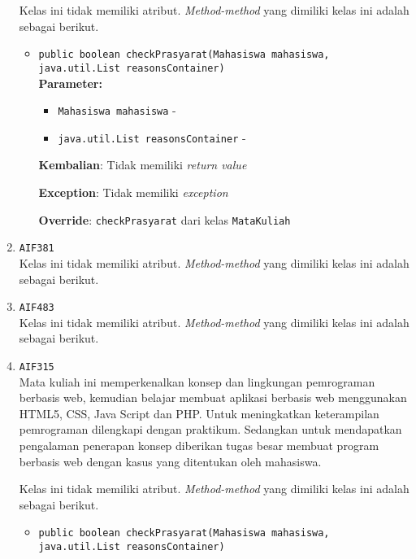 \documentclass{article}
\begin{document}
\begin{enumerate}
Kelas ini tidak memiliki atribut. \textit{Method-method} yang dimiliki kelas ini adalah sebagai berikut.
\begin{itemize}
\item \texttt{public boolean checkPrasyarat(Mahasiswa mahasiswa, java.util.List reasonsContainer)}\\ 


\textbf{Parameter:}\begin{itemize}
\item \texttt{Mahasiswa mahasiswa} - 
\item \texttt{java.util.List reasonsContainer} - 
\end{itemize}
\textbf{Kembalian}: Tidak memiliki \textit{return value}

\textbf{Exception}: Tidak memiliki \textit{exception}

\textbf{Override}: \texttt{checkPrasyarat} dari kelas \texttt{MataKuliah}

\end{itemize}
\item \texttt{AIF381}\\ 
Kelas ini tidak memiliki atribut. \textit{Method-method} yang dimiliki kelas ini adalah sebagai berikut.
\begin{itemize}
\end{itemize}
\item \texttt{AIF483}\\ 
Kelas ini tidak memiliki atribut. \textit{Method-method} yang dimiliki kelas ini adalah sebagai berikut.
\begin{itemize}
\end{itemize}
\item \texttt{AIF315}\\ 
Mata kuliah ini memperkenalkan konsep dan lingkungan pemrograman berbasis web,
 kemudian belajar membuat aplikasi berbasis web menggunakan HTML5, CSS, Java Script 
 dan PHP. Untuk meningkatkan keterampilan pemrograman dilengkapi dengan praktikum. 
 Sedangkan untuk mendapatkan pengalaman penerapan konsep diberikan tugas besar membuat 
 program berbasis web dengan kasus yang ditentukan oleh mahasiswa.

Kelas ini tidak memiliki atribut. \textit{Method-method} yang dimiliki kelas ini adalah sebagai berikut.
\begin{itemize}
\item \texttt{public boolean checkPrasyarat(Mahasiswa mahasiswa, java.util.List reasonsContainer)}\\ 



\end{itemize}
\end{enumerate}
\end{document}
